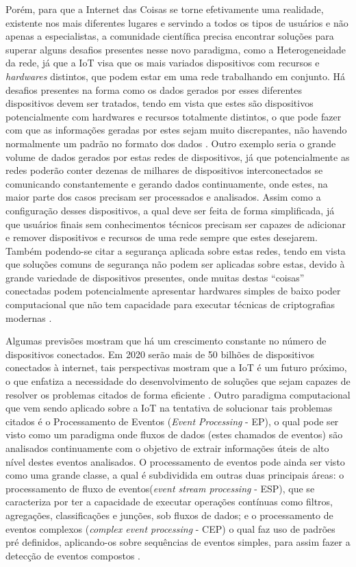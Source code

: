 \documentclass[ti,table]{texufpel} %
\begin{document}
Porém, para que a Internet das Coisas se torne efetivamente uma realidade, existente nos mais diferentes lugares e servindo a todos os tipos de usuários e não apenas a especialistas, a comunidade científica precisa encontrar soluções para superar alguns desafios presentes nesse novo paradigma, como a Heterogeneidade da rede, já que a IoT visa que os mais variados dispositivos com recursos e \textit{hardwares} distintos, que podem estar em uma rede trabalhando em conjunto. Há desafios presentes na forma como os dados gerados por esses diferentes dispositivos devem ser tratados, tendo em vista que estes são dispositivos potencialmente com hardwares e recursos totalmente distintos, o que pode fazer com que as informações geradas por estes sejam muito discrepantes, não havendo normalmente um padrão no formato dos dados \cite{agrawal2013survey}. Outro exemplo seria o grande volume de dados gerados por estas redes de dispositivos, já que potencialmente as redes poderão conter dezenas de milhares de dispositivos interconectados se comunicando constantemente e gerando dados continuamente, onde estes, na maior parte dos casos precisam ser processados e analisados. Assim como a configuração desses dispositivos, a qual deve ser feita de forma simplificada, já que usuários finais sem conhecimentos técnicos precisam ser capazes de adicionar e remover dispositivos e recursos de uma rede sempre que estes desejarem. Também podendo-se citar a segurança aplicada sobre estas redes, tendo em vista que soluções comuns de segurança não podem ser aplicadas sobre estas,  devido à grande variedade de dispositivos presentes, onde muitas destas ``coisas'' conectadas podem potencialmente apresentar hardwares simples de baixo poder computacional que não tem capacidade para executar técnicas de criptografias modernas \cite{agrawal2013survey}. 

  

  

Algumas previsões mostram que há um crescimento constante no número de dispositivos conectados. Em 2020 serão mais de 50 bilhões de dispositivos conectados à internet, tais perspectivas mostram que a IoT é um futuro próximo, o que enfatiza a necessidade do desenvolvimento de soluções que sejam capazes de resolver os problemas citados de forma eficiente \cite{xavier2016smart}. Outro paradigma computacional que vem sendo aplicado sobre a IoT na tentativa de solucionar tais problemas citados é o  Processamento de Eventos (\textit{Event Processing} - EP), o qual pode ser visto como um paradigma onde fluxos de dados (estes chamados de eventos) são analisados continuamente com o objetivo de extrair informações úteis de alto nível destes eventos analisados. O processamento de eventos pode ainda ser visto como uma grande classe, a qual é subdividida em outras duas principais áreas: o processamento de fluxo de eventos(\textit{event stream processing} - ESP), que se caracteriza por ter a capacidade de executar operações contínuas como filtros, agregações, classificações e junções, sob fluxos de dados; e o processamento de eventos complexos (\textit{complex event processing} - CEP) o qual faz uso de padrões pré definidos, aplicando-os sobre sequências de eventos simples, para assim fazer a detecção de eventos compostos \cite{dayarathna2018recent}. 
\end{document}
